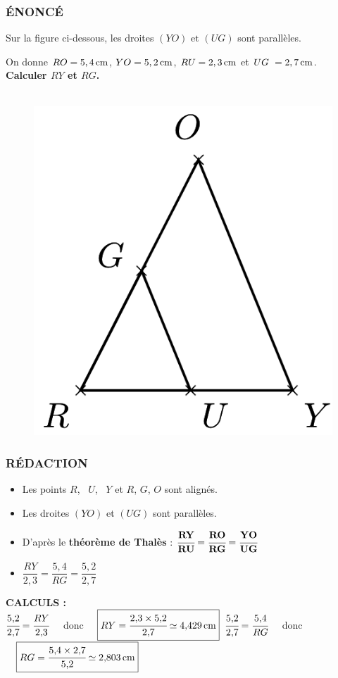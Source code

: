 \documentclass[11pt]{article}
\begin{document}
\begin{multicols}{2}

  \subsubsection*{ÉNONCÉ}

  Sur la figure ci-dessous, les droites $(YO)\text{ et }(UG)$ sont parallèles.

  On donne $RO=\unit[5,4]{cm}$, $YO=\unit[5,2]{cm}$, $RU=\unit[2,3]{cm}$ et $UG~= \unit[2,7]{cm}$. \\
  \textbf{Calculer $RY$ et $RG$.}

  \begin{figure}[H]
          \centering
          \includegraphics[width=0.4\linewidth]{3x6-thales/sources/thales-1.png}
    \end{figure}
  \columnbreak

  \subsubsection*{RÉDACTION}
  
  \begin{itemize}
    \item Les points $R$,~ $U$,~ $Y$ et $R$, $G$, $O$ sont alignés.
    \item Les droites $(YO)$ et $(UG)$ sont parallèles.
    \item D'après le \textbf{théorème de Thalès} : $\mathbf{\cfrac{RY}{RU}=\cfrac{RO}{RG}=\cfrac{YO}{UG}}$
    \item $\dfrac{RY}{2,3}=\dfrac{5,4}{RG}=\dfrac{5,2}{2,7}$\\
  \end{itemize}

  \textbf{CALCULS :} \\

  $\cfrac{5{,}2}{2{,}7}=\cfrac{RY}{2{,}3} \quad$ donc $\quad \boxed{RY=\cfrac{2{,}3\times 5{,}2}{2{,}7}\simeq\unit[4{,}429]{cm}}$ \newline
  $\cfrac{5{,}2}{2{,}7}=\cfrac{5{,}4}{RG} \quad$ donc $\quad \boxed{RG=\cfrac{5{,}4\times 2{,}7}{5{,}2}\simeq\unit[2{,}803]{cm}}$
   
\end{multicols}
\end{document}
